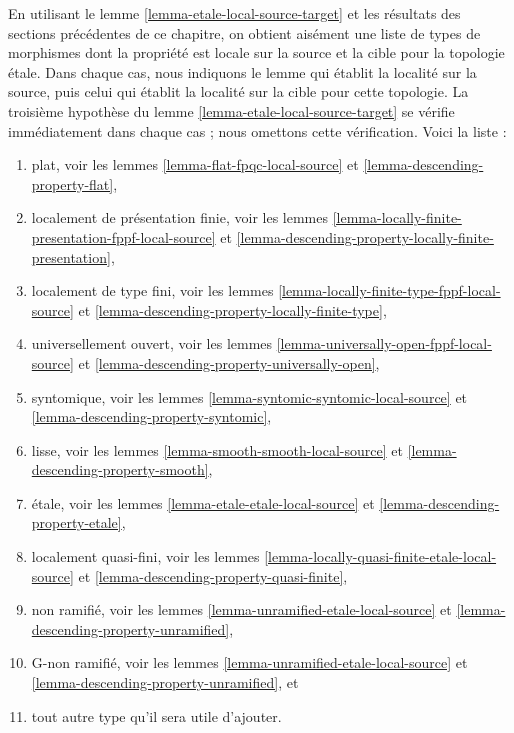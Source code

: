\begin{remark}
\label{remark-list-local-source-target}
En utilisant le lemme \ref{lemma-etale-local-source-target} et les résultats
des sections précédentes de ce chapitre, on obtient aisément une liste de
types de morphismes dont la propriété est locale sur la source et la cible pour
la topologie \'etale. Dans chaque cas, nous indiquons le lemme qui établit la
localité sur la source, puis celui qui établit la localité sur la cible pour
cette topologie. La troisième hypothèse du
lemme \ref{lemma-etale-local-source-target} se vérifie immédiatement dans
chaque cas ; nous omettons cette vérification. Voici la liste :
\begin{enumerate}
\item plat, voir les lemmes \ref{lemma-flat-fpqc-local-source} et
\ref{lemma-descending-property-flat},
\item localement de présentation finie, voir les lemmes
\ref{lemma-locally-finite-presentation-fppf-local-source} et
\ref{lemma-descending-property-locally-finite-presentation},
\item localement de type fini, voir les lemmes
\ref{lemma-locally-finite-type-fppf-local-source} et
\ref{lemma-descending-property-locally-finite-type},
\item universellement ouvert, voir les lemmes
\ref{lemma-universally-open-fppf-local-source} et
\ref{lemma-descending-property-universally-open},
\item syntomique, voir les lemmes \ref{lemma-syntomic-syntomic-local-source} et
\ref{lemma-descending-property-syntomic},
\item lisse, voir les lemmes \ref{lemma-smooth-smooth-local-source} et
\ref{lemma-descending-property-smooth},
\item \'etale, voir les lemmes \ref{lemma-etale-etale-local-source} et
\ref{lemma-descending-property-etale},
\item localement quasi-fini, voir les lemmes
\ref{lemma-locally-quasi-finite-etale-local-source} et
\ref{lemma-descending-property-quasi-finite},
\item non ramifié, voir les lemmes \ref{lemma-unramified-etale-local-source} et
\ref{lemma-descending-property-unramified},
\item G-non ramifié, voir les lemmes
\ref{lemma-unramified-etale-local-source} et
\ref{lemma-descending-property-unramified}, et
\item tout autre type qu'il sera utile d'ajouter.
\end{enumerate}
\end{remark}

